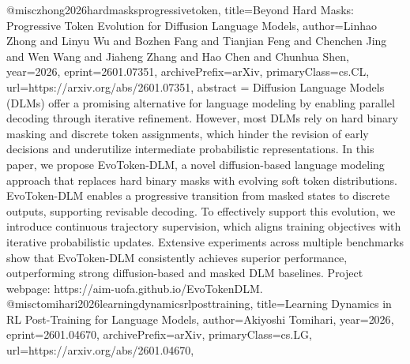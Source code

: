 {}@misc{zhong2026hardmasksprogressivetoken,
      title={Beyond Hard Masks: Progressive Token Evolution for Diffusion Language Models}, 
      author={Linhao Zhong and Linyu Wu and Bozhen Fang and Tianjian Feng and Chenchen Jing and Wen Wang and Jiaheng Zhang and Hao Chen and Chunhua Shen},
      year={2026},
      eprint={2601.07351},
      archivePrefix={arXiv},
      primaryClass={cs.CL},
      url={https://arxiv.org/abs/2601.07351},
      abstract = {Diffusion Language Models (DLMs) offer a promising alternative for language modeling by enabling parallel decoding through iterative refinement. However, most DLMs rely on hard binary masking and discrete token assignments, which hinder the revision of early decisions and underutilize intermediate probabilistic representations. In this paper, we propose EvoToken-DLM, a novel diffusion-based language modeling approach that replaces hard binary masks with evolving soft token distributions. EvoToken-DLM enables a progressive transition from masked states to discrete outputs, supporting revisable decoding. To effectively support this evolution, we introduce continuous trajectory supervision, which aligns training objectives with iterative probabilistic updates. Extensive experiments across multiple benchmarks show that EvoToken-DLM consistently achieves superior performance, outperforming strong diffusion-based and masked DLM baselines. Project webpage: https://aim-uofa.github.io/EvoTokenDLM.}
}@misc{tomihari2026learningdynamicsrlposttraining,
      title={Learning Dynamics in RL Post-Training for Language Models}, 
      author={Akiyoshi Tomihari},
      year={2026},
      eprint={2601.04670},
      archivePrefix={arXiv},
      primaryClass={cs.LG},
      url={https://arxiv.org/abs/2601.04670},
}
